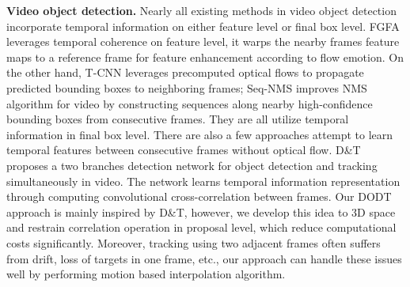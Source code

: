 \documentclass[a4paper, 10pt, conference]{ieeeconf}      %
\begin{document}
\textbf{Video object detection.} Nearly all existing methods in video object detection incorporate temporal information on either feature level or final box level. FGFA \cite{zhu2017flow} leverages temporal coherence on feature level, it warps the nearby frames feature maps to a reference frame for feature enhancement according to flow emotion. On the other hand, T-CNN \cite{kang2018t, kang2016object} leverages precomputed optical flows to propagate predicted bounding boxes to neighboring frames; Seq-NMS \cite{han2016seq} improves NMS algorithm for video by constructing sequences along nearby high-confidence bounding boxes from consecutive frames. They are all utilize temporal information in final box level. There are also a few approaches attempt to learn temporal features between consecutive frames without optical flow. D\&T \cite{feichtenhofer2017detect} proposes a two branches detection network for object detection and tracking simultaneously in video. The network learns temporal information representation through computing convolutional cross-correlation between frames. Our DODT approach is mainly inspired by D\&T, however, we develop this idea to 3D space and restrain correlation operation in proposal level, which reduce computational costs significantly. Moreover, tracking using two adjacent frames often suffers from drift, loss of targets in one frame, etc., our approach can handle these issues well by performing motion based interpolation algorithm.


\end{document}
